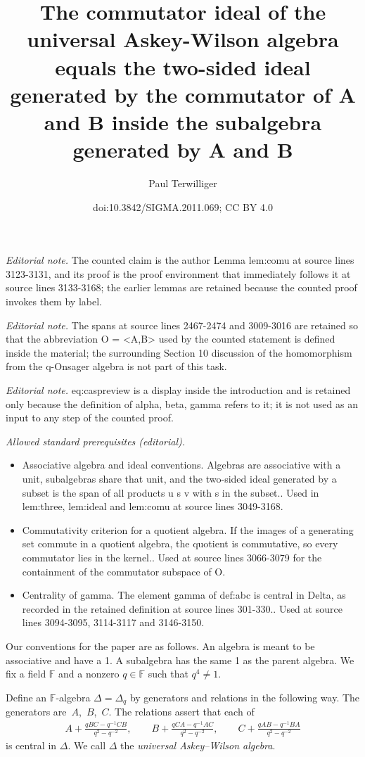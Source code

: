 \documentclass[10pt,a4paper]{amsart}
\title{The commutator ideal of the universal Askey-Wilson algebra equals the two-sided ideal generated by the commutator of A and B inside the subalgebra generated by A and B}
\author{Paul Terwilliger}
\date{doi:10.3842/SIGMA.2011.069; CC BY 4.0}
\numberwithin{equation}{section}
\begin{document}
\maketitle
\noindent\textit{Editorial note.} The counted claim is the author Lemma lem:comu at source lines 3123-3131, and its proof is the proof environment that immediately follows it at source lines 3133-3168; the earlier lemmas are retained because the counted proof invokes them by label.\par\medskip
\noindent\textit{Editorial note.} The spans at source lines 2467-2474 and 3009-3016 are retained so that the abbreviation O = <A,B> used by the counted statement is defined inside the material; the surrounding Section 10 discussion of the homomorphism from the q-Onsager algebra is not part of this task.\par\medskip
\noindent\textit{Editorial note.} eq:caspreview is a display inside the introduction and is retained only because the definition of alpha, beta, gamma refers to it; it is not used as an input to any step of the counted proof.\par\medskip
\noindent\textit{Allowed standard prerequisites (editorial).}\begin{itemize}
\item Associative algebra and ideal conventions. Algebras are associative with a unit, subalgebras share that unit, and the two-sided ideal generated by a subset is the span of all products u s v with s in the subset.. Used in lem:three, lem:ideal and lem:comu at source lines 3049-3168.
\item Commutativity criterion for a quotient algebra. If the images of a generating set commute in a quotient algebra, the quotient is commutative, so every commutator lies in the kernel.. Used at source lines 3066-3079 for the containment of the commutator subspace of O.
\item Centrality of gamma. The element gamma of def:abc is central in Delta, as recorded in the retained definition at source lines 301-330.. Used at source lines 3094-3095, 3114-3117 and 3146-3150.
\end{itemize}\medskip
Our conventions for the paper are as follows.
An algebra is meant to be associative and have a 1.
A subalgebra has the same 1 as the parent algebra.
We f\/ix a f\/ield $\mathbb F$
and  a nonzero $q \in \mathbb F$ such that $q^4\not=1$.

\begin{Definition}
\label{def:uaw}
Def\/ine an $\mathbb F$-algebra
$\Delta=\Delta_q$
 by generators and relations in the following way.
The generators are~$A$,~$B$,~$C$.
The relations assert that each of
\begin{gather}
 A+ \frac{qBC-q^{-1}CB}{q^2-q^{-2}},
\qquad B+
\frac{qCA-q^{-1}AC}{q^2-q^{-2}},
\qquad
C+
\frac{qAB-q^{-1}BA}{q^2-q^{-2}}
\label{eq:comlist}
\end{gather}
is central in $\Delta$.
We call $\Delta$ the {\it universal Askey--Wilson algebra}.
\end{Definition}
\end{document}
